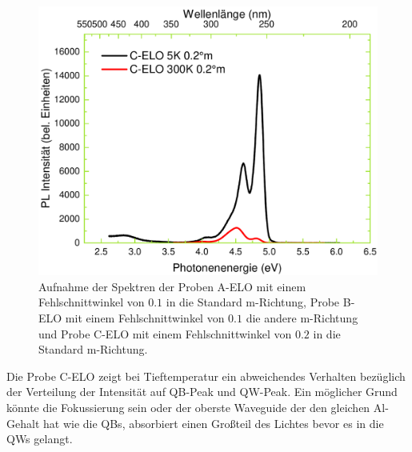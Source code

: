 \begin{figure}[ht]
\begin{minipage}[t]{0.49\textwidth}
    \includegraphics[width=\linewidth]{Bilder/TS4045/celo.pdf}
  \end{minipage}
	\caption{Aufnahme der Spektren der Proben A-ELO mit einem Fehlschnittwinkel von $0.1$ in die Standard m-Richtung, Probe B-ELO mit einem Fehlschnittwinkel von $0.1$ die andere m-Richtung und Probe C-ELO mit einem Fehlschnittwinkel von $0.2$ in die Standard m-Richtung. }
	\label{fig:spectraselo}
\end{figure}
\noindent 
Die Probe C-ELO zeigt bei Tieftemperatur ein abweichendes Verhalten bezüglich der Verteilung der Intensität auf QB-Peak und QW-Peak. Ein möglicher Grund könnte die Fokussierung sein oder der oberste Waveguide der den gleichen Al-Gehalt hat wie die QBs, absorbiert einen Großteil des Lichtes bevor es in die QWs gelangt. 
